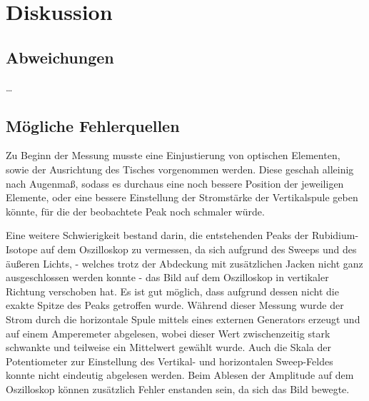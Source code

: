 \section{Diskussion}
\label{sec:diskussion}

\subsection{Abweichungen}

…


\subsection{Mögliche Fehlerquellen}

    Zu Beginn der Messung musste eine Einjustierung von optischen Elementen,
    sowie der Ausrichtung des Tisches vorgenommen werden.
    Diese geschah alleinig nach Augenmaß,
    sodass es durchaus eine noch bessere Position der jeweiligen Elemente,
    oder eine bessere Einstellung der Stromstärke der Vertikalspule geben könnte,
    für die der beobachtete Peak noch schmaler würde.

    Eine weitere Schwierigkeit bestand darin,
    die entstehenden Peaks der Rubidium-Isotope auf dem Oszilloskop zu vermessen,
    da sich aufgrund des Sweeps und des äußeren Lichts,
    - welches trotz der Abdeckung mit zusätzlichen Jacken nicht ganz ausgeschlossen werden konnte -
    das Bild auf dem Oszilloskop in vertikaler Richtung verschoben hat.
    Es ist gut möglich,
    dass aufgrund dessen nicht die exakte Spitze des Peaks getroffen wurde.
    Während dieser Messung wurde der Strom durch die horizontale Spule mittels eines externen Generators erzeugt und auf einem Amperemeter abgelesen,
    wobei dieser Wert zwischenzeitig stark schwankte und teilweise ein Mittelwert gewählt wurde.
    Auch die Skala der Potentiometer zur Einstellung des Vertikal- und horizontalen Sweep-Feldes konnte nicht eindeutig abgelesen werden.
    Beim Ablesen der Amplitude auf dem Oszilloskop können zusätzlich Fehler enstanden sein,
    da sich das Bild bewegte.
